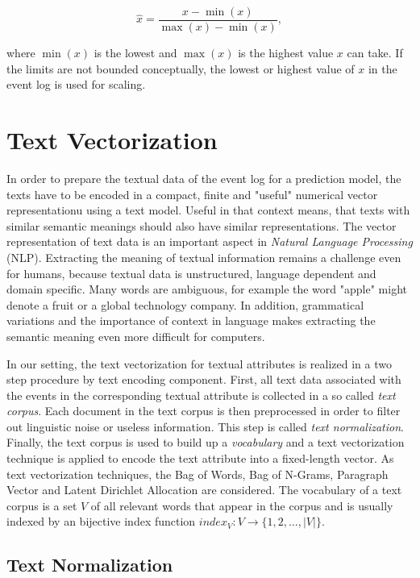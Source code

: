 $$\hat{x} = \dfrac{x-\min(x)}{\max(x) - \min(x)},$$

where $\min(x)$ is the lowest and $\max(x)$ is the highest value $x$ can take.
If the limits are not bounded conceptually, the lowest or highest value of $x$ in the event log is used for scaling.

\section{Text Vectorization}\label{sec:text}

In order to prepare the textual data of the event log for a prediction model, the texts have to be encoded in a compact, finite and "useful" numerical vector representationu using a text model.
Useful in that context means, that texts with similar semantic meanings should also have similar representations.
The vector representation of text data is an important aspect in \textit{Natural Language Processing} (NLP).
Extracting the meaning of textual information remains a challenge even for humans, because textual data is unstructured, language dependent and domain specific.
Many words are ambiguous, for example the word "apple" might denote a fruit or a global technology company.
In addition, grammatical variations and the importance of context in language makes extracting the semantic meaning even more difficult for computers.

In our setting, the text vectorization for textual attributes is realized in a two step procedure by text encoding component.
First, all text data associated with the events in the corresponding textual attribute is collected in a so called \textit{text corpus}.
Each document in the text corpus is then preprocessed in order to filter out linguistic noise or useless information.
This step is called \textit{text normalization}.
Finally, the text corpus is used to build up a \textit{vocabulary} and a text vectorization technique is applied to encode the text attribute into a fixed-length vector.
As text vectorization techniques, the Bag of Words, Bag of N-Grams, Paragraph Vector and Latent Dirichlet Allocation are considered.
The vocabulary of a text corpus is a set $V$ of all relevant words that appear in the corpus and is usually indexed by an bijective index function $index_V \colon V \to \{1, 2, \dots, |V|\}$.


\subsection{Text Normalization}

